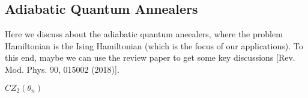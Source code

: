 \lipsum[1-2]

\subsection{Adiabatic Quantum Annealers}

Here we discuss about the adiabatic quantum aneealers, where the problem Hamiltonian is the Ising Hamiltonian (which is the focus of our applications). To this end, maybe we can use the review paper to get some key discussions [Rev. Mod. Phys. 90, 015002 (2018)].

$CZ_{2}(\theta_{n})$

\lipsum[1-2]





